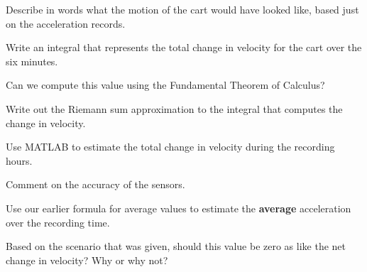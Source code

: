 \vspace{1in} 

Describe in words what the motion of the cart would have looked like,
based just on the acceleration records.

\vfill

\newpage

\problem Write an integral that represents the total change in
velocity for the cart over the six minutes.

\vfill

Can we compute this value using the Fundamental Theorem of Calculus?

\vfill

\newpage

\problem Write out the Riemann sum approximation to the integral that
computes the change in velocity.

\vfill

Use MATLAB to estimate the total change in velocity during the
recording hours.

\vspace{1in}

Comment on the accuracy of the sensors.
\vfill
\vfill

\newpage

\problem Use our earlier formula for average values to estimate the
{\bf average} acceleration over the recording time.

\vspace{1in}

Based on the scenario that was given, should this value be zero as
like the net change in velocity?  Why or why not?

\vfill























